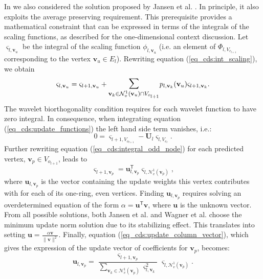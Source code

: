 \documentclass[graybox]{svmult}
\begin{document}
In \cite{Cioaca2016} we also considered the solution proposed by Jansen et al. \cite{Jansen2001}. In principle, it also exploits the average preserving requirement. This prerequisite provides a mathematical constraint that can be expressed in terms of the integrals of the scaling functions, as described for the one-dimensional context discussion. Let $\varsigma_{l,\mathbf{v}_u}$ be the integral of the scaling function $\phi_{l, \mathbf{v}_u}$ (i.e. an element 
of $\Phi_{l,V_{e_{l+1}}}$ corresponding to the vertex $\mathbf{v}_u \in E_l$). Rewriting equation (\ref{eq_cds:int_scaling}), we obtain
\begin{equation}
\varsigma_{l,\mathbf{v}_u} = \varsigma_{l+1, \mathbf{v}_u} + \mathlarger{\mathlarger{\sum}}_{\mathbf{v}_k \in \mathcal{N}_v^1(\mathbf{v}_u) \cap V_{o_{l+1}}} { p_{l,\mathbf{v}_k}(\mathbf{v}_u)
	\varsigma_{l+1, \mathbf{v}_k}} .
\label{eq_cds:integral_update}
\end{equation}
The wavelet biorthogonality condition requires for each wavelet function to have zero integral. In consequence, when integrating equation (\ref{eq_cds:update_functions}) the left hand side
term vanishes, i.e.:
\begin{equation}
0 = \varsigma_{l+1,V_{o_{l+1}}} - \mathbf{U}_l \varsigma_{l,V_{e_l}}.
\label{eq_cds:integral_wavelet}
\end{equation} 
Further rewriting equation (\ref{eq_cds:integral_odd_node}) for each predicted vertex, $\mathbf{v}_p \in V_{o_{l+1}}$, leads to
\begin{equation}
\varsigma_{l+1,\mathbf{v}_p} = \mathbf{u}_{l,\mathbf{v}_p}^{\mathsf{T}} \varsigma_{l, \mathcal{N}_v^1(\mathbf{v}_p)},
\label{eq_cds:scaling_function_integral}
\end{equation}
where $\mathbf{u}_{l,\mathbf{v}_p}$ is the vector containing the update weights this vertex contributes with for each of its one-ring, even vertices. Finding $\mathbf{u}_{l,\mathbf{v}_p}$
requires solving an overdetermined equation of the form $\alpha = \mathbf{u ^\mathsf{T} v}$, where $\mathbf{u}$ is the unknown vector. From all possible solutions, both Jansen et al. \cite{Jansen2001} and Wagner et al. \cite{Wagner2005} choose the minimum update norm solution due to its stabilizing effect. This translates into setting $\mathbf{u} = \frac{\alpha \mathbf{v}}{\| \mathbf{v} \|^2}$. 
Finally, equation (\ref{eq_cds:update_column_vector}), which gives the expression of the update vector of coefficients for $\mathbf{v}_p$, becomes:
\begin{equation}
\mathbf{u}_{l,\mathbf{v}_p} = \frac{\varsigma_{l+1,\mathbf{v}_p}}{\sum_{\mathbf{v}_k \in \mathcal{N}_v^1(\mathbf{v}_p)} \varsigma_{l,\mathbf{v}_k}^2}
\varsigma_{l, \mathcal{N}_v^1(\mathbf{v}_p)} .
\label{eq_cds:update_coefficient_vector}
\end{equation}
\end{document}
